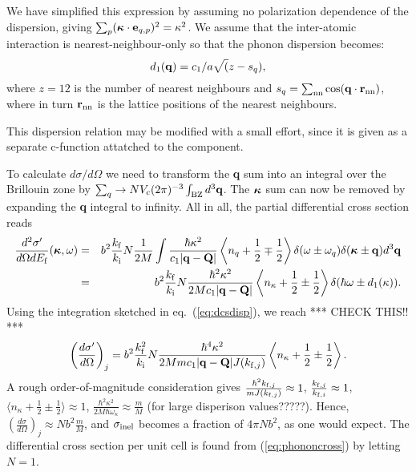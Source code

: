 We have simplified this expression by assuming no polarization
dependence of the dispersion, giving 
$\sum_{p} (\mbox{\boldmath $\kappa$} \cdot {\bf e}_{q,p})^2 = \kappa^2$.
We assume that the inter-atomic interaction is nearest-neighbour-only
so that the phonon dispersion becomes: 
\begin{equation}
d_1({\bf q}) = c_1/a \sqrt(z-s_q) ,
\end{equation}
where $z=12$ is the number of nearest neighbours and 
$s_q=\sum_{\rm nn} \cos({\bf q} \cdot {\bf r}_{\rm nn})$,
where in turn ${\bf r}_{\rm nn}$ is the lattice positions of the 
nearest neighbours.

This dispersion relation may be modified with a small effort,
since it is given as a separate c-function attatched to the component.

To calculate $d\sigma/d\Omega$ we need to transform the 
{\bf q} sum into an integral over the Brillouin zone by 
$\sum_q \rightarrow N V_{\rm c} (2\pi)^{-3} \int_{\rm BZ} d^3{\bf q}$.
The $\mbox{\boldmath $\kappa$}$ sum can now be removed by
expanding the {\bf q} integral to infinity. 
All in all, the partial differential cross section reads
\begin{eqnarray}
\frac{d^2\sigma'}{d\Omega dE_{\rm f}}
  (\mbox{\boldmath $\kappa$},\omega) &=&
  b^2 \frac{k_{\rm f}}{k_{\rm i}} N \frac{1}{2M} 
  \int \frac{\hbar \kappa^2}{c_1 |{\bf q}-{\bf Q}|} 
  \left\langle n_{q}+\frac{1}{2}\mp\frac{1}{2} \right\rangle
  \delta(\omega\pm\omega_{q}) \delta(\mbox{\boldmath $\kappa$}\pm{\bf q}) 
   d^3{\bf q} \nonumber \\
 &=& b^2 \frac{k_{\rm f}}{k_{\rm i}} N 
          \frac{\hbar^2 \kappa^2}{2M c_1|{\bf q}-{\bf Q}|} 
  \left\langle n_{\kappa}+\frac12\pm\frac12 \right\rangle 
  \delta(\hbar\omega\pm d_1(\kappa)) .
\end{eqnarray}
Using the integration sketched in eq.~(\ref{eq:dcsdisp}), we reach
*** CHECK THIS!! ***
\begin{equation} \label{eq:phononcross}
\left(\frac{d\sigma'}{d\Omega}\right)_j =
b^2 \frac{k_{\rm f}^2}{k_{\rm i}} N 
\frac{\hbar^4 \kappa^2}{2Mm c_1 |{\bf q}-{\bf Q}| J(k_{{\rm f},j})} 
\left\langle n_{\kappa}+\frac12\pm\frac12 \right\rangle . 
\end{equation}
A rough order-of-magnitude consideration gives
$\frac{\hbar^2 k_{{\rm f},j}}{mJ(k_{{\rm f},j})} \approx 1$,
$\frac{k_{{\rm f},j}}{k_{{\rm f},i}}\approx 1$,
$\langle n_{\kappa}+\frac12\pm\frac12 \rangle \approx 1$,
$\frac{\hbar^2\kappa^2}{2M\hbar\omega_\kappa}
\approx \frac{m}{M}$ (for large disperison values?????).
Hence, $\left(\frac{d\sigma}{d\Omega}\right)_j \approx N b^2 \frac{m}{M}$, and
$\sigma_{\rm inel}$ becomes a fraction of $4 \pi N b^2$, as one
would expect.
The differential cross section per unit cell is found from 
(\ref{eq:phononcross}) by letting $N=1$. 

